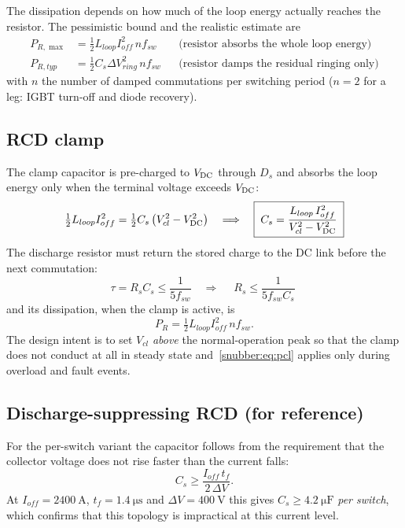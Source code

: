 The dissipation depends on how much of the loop energy actually reaches the
resistor. The pessimistic bound and the realistic estimate are
\begin{align}
P_{R,\max} &= \tfrac{1}{2}L_{loop} I_{off}^{2}\, n f_{sw} && \text{(resistor absorbs the whole loop energy)} \label{snubber:eq:prmax}\\
P_{R,typ}  &= \tfrac{1}{2}C_s \Delta V_{ring}^{2}\, n f_{sw} && \text{(resistor damps the residual ringing only)} \label{snubber:eq:prtyp}
\end{align}
with $n$ the number of damped commutations per switching period ($n=2$ for a
leg: IGBT turn-off and diode recovery).

\subsection{RCD clamp}

The clamp capacitor is pre-charged to $V_{\mathrm{DC}}$ through $D_s$ and absorbs the
loop energy only when the terminal voltage exceeds $V_{\mathrm{DC}}$:
\begin{equation}
\tfrac{1}{2}L_{loop} I_{off}^{2}
= \tfrac{1}{2}C_s\left(V_{cl}^{2}-V_{\mathrm{DC}}^{2}\right)
\quad\Longrightarrow\quad
\boxed{\;C_s = \frac{L_{loop}\,I_{off}^{2}}{V_{cl}^{2}-V_{\mathrm{DC}}^{2}}\;}
\label{snubber:eq:ccl}
\end{equation}
The discharge resistor must return the stored charge to the DC link before the
next commutation:
\begin{equation}
\tau = R_s C_s \le \frac{1}{5 f_{sw}}
\quad\Longrightarrow\quad
\boxed{\;R_s \le \frac{1}{5 f_{sw} C_s}\;}
\label{snubber:eq:rcl}
\end{equation}
and its dissipation, when the clamp is active, is
\begin{equation}
P_{R} = \tfrac{1}{2}L_{loop}I_{off}^{2}\,n f_{sw}.
\label{snubber:eq:pcl}
\end{equation}
The design intent is to set $V_{cl}$ \emph{above} the normal-operation peak so
that the clamp does not conduct at all in steady state and~\eqref{snubber:eq:pcl}
applies only during overload and fault events.

\subsection{Discharge-suppressing RCD (for reference)}

For the per-switch variant the capacitor follows from the requirement that the
collector voltage does not rise faster than the current falls:
\begin{equation}
C_s \ge \frac{I_{off}\,t_f}{2\,\Delta V}.
\end{equation}
At $I_{off}=\SI{2400}{\ampere}$, $t_f=\SI{1.4}{\micro\second}$ and
$\Delta V = \SI{400}{\volt}$ this gives $C_s \ge \SI{4.2}{\micro\farad}$
\emph{per switch}, which confirms that this topology is impractical at this
current level.

